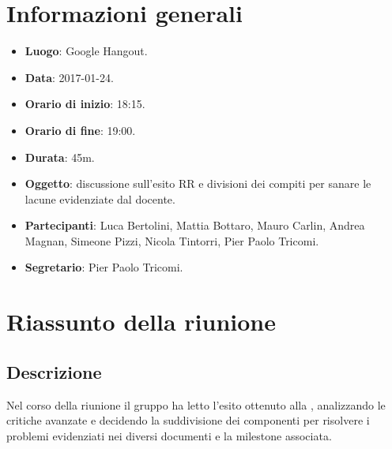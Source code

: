 \documentclass[a4paper,titlepage]{article}
\begin{document}
\maketitle
\begin{diario}
\end{diario}
\newpage
\tableofcontents

\newpage
\section{Informazioni generali}
\label{sec:Informazioni}

\begin{itemize}
  \item \textbf{Luogo}: Google Hangout.
  \item \textbf{Data}: 2017-01-24.
  \item \textbf{Orario di inizio}: 18:15.
  \item \textbf{Orario di fine}: 19:00.
  \item \textbf{Durata}: 45m.
  \item \textbf{Oggetto}: discussione sull'esito RR e divisioni dei compiti per sanare le lacune evidenziate dal docente.
  \item \textbf{Partecipanti}: Luca Bertolini, Mattia Bottaro, Mauro Carlin, Andrea Magnan, Simeone Pizzi, Nicola Tintorri, Pier Paolo Tricomi.
  \item \textbf{Segretario}: Pier Paolo Tricomi.

\end{itemize}
\section{Riassunto della riunione}
\label{sec:RiassuntoRiunione}
 \subsection{Descrizione}
Nel corso della riunione il gruppo \GRUPPO{} ha letto l'esito ottenuto alla \RR{}, analizzando le critiche avanzate e decidendo la suddivisione dei componenti per risolvere i problemi evidenziati nei diversi documenti e la milestone associata.  
\end{document}
